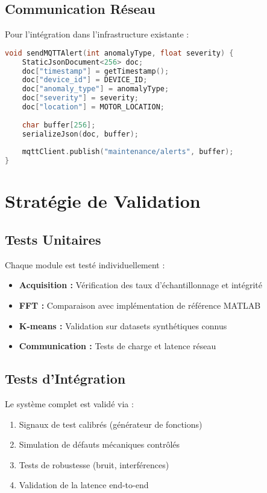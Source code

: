 \subsection{Communication Réseau}

Pour l'intégration dans l'infrastructure existante :

\begin{lstlisting}[language=C, caption=Communication MQTT pour alertes]
void sendMQTTAlert(int anomalyType, float severity) {
    StaticJsonDocument<256> doc;
    doc["timestamp"] = getTimestamp();
    doc["device_id"] = DEVICE_ID;
    doc["anomaly_type"] = anomalyType;
    doc["severity"] = severity;
    doc["location"] = MOTOR_LOCATION;
    
    char buffer[256];
    serializeJson(doc, buffer);
    
    mqttClient.publish("maintenance/alerts", buffer);
}
\end{lstlisting}

\section{Stratégie de Validation}

\subsection{Tests Unitaires}

Chaque module est testé individuellement :

\begin{itemize}
    \item \textbf{Acquisition :} Vérification des taux d'échantillonnage et intégrité
    \item \textbf{FFT :} Comparaison avec implémentation de référence MATLAB
    \item \textbf{K-means :} Validation sur datasets synthétiques connus
    \item \textbf{Communication :} Tests de charge et latence réseau
\end{itemize}

\subsection{Tests d'Intégration}

Le système complet est validé via :

\begin{enumerate}
    \item Signaux de test calibrés (générateur de fonctions)
    \item Simulation de défauts mécaniques contrôlés
    \item Tests de robustesse (bruit, interférences)
    \item Validation de la latence end-to-end
\end{enumerate}

